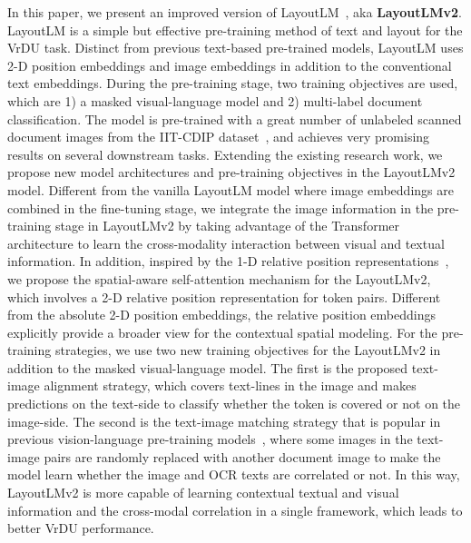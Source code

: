\documentclass{article} \usepackage{iclr2021_conference,times}
\begin{document}
In this paper, we present an improved version of LayoutLM~\citep{10.1145/3394486.3403172}, aka \textbf{LayoutLMv2}. LayoutLM is a simple but effective pre-training method of text and layout for the VrDU task. Distinct from previous text-based pre-trained models, LayoutLM uses 2-D position embeddings and image embeddings in addition to the conventional text embeddings. During the pre-training stage, two training objectives are used, which are 1) a masked visual-language model and 2) multi-label document classification. The model is pre-trained with a great number of unlabeled scanned document images from the IIT-CDIP dataset~\citep{10.1145/1148170.1148307}, and achieves very promising results on several downstream tasks.
Extending the existing research work, we propose new model architectures and pre-training objectives in the LayoutLMv2 model. Different from the vanilla LayoutLM model where image embeddings are combined in the fine-tuning stage, we integrate the image information in the pre-training stage in LayoutLMv2 by taking advantage of the Transformer architecture to learn the cross-modality interaction between visual and textual information.
In addition, inspired by the 1-D relative position representations~\citep{Shaw_2018, raffel2020exploring, bao2020unilmv2}, we propose the spatial-aware self-attention mechanism for the LayoutLMv2, which involves a 2-D relative position representation for token pairs. Different from the absolute 2-D position embeddings, the relative position embeddings explicitly provide a broader view for the contextual spatial modeling.
For the pre-training strategies, we use two new training objectives for the LayoutLMv2 in addition to the masked visual-language model.
The first is the proposed text-image alignment strategy, which covers text-lines in the image and makes predictions on the text-side to classify whether the token is covered or not on the image-side.
The second is the text-image matching strategy that is popular in previous vision-language pre-training models~\citep{tan2019lxmert,lu2019vilbert,su2020vlbert,chen2020uniter,Sun_2019_ICCV}, where some images in the text-image pairs are randomly replaced with another document image to make the model learn whether the image and OCR texts are correlated or not.
In this way, LayoutLMv2 is more capable of learning contextual textual and visual information and the cross-modal correlation in a single framework, which leads to better VrDU performance.
\end{document}
